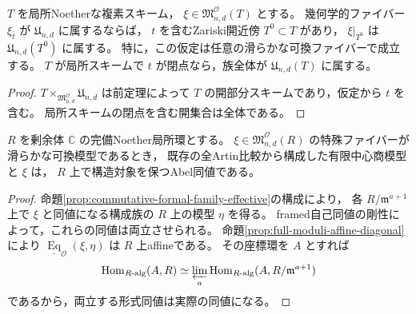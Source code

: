 \begin{corollary}[任意の族における構成近傍の開性]
\label{cor:familywise-classical-neighborhood}
$T$ を局所Noetherな複素スキーム，
$\xi\in\mathfrak M^{\mathcal O}_{n,d}(T)$ とする。
幾何学的ファイバー $\xi_{\bar t}$ が $\mathfrak U_{n,d}$ に属するならば，
$t$ を含むZariski開近傍 $T^0\subset T$ があり，
$\xi|_{T^0}$ は $\mathfrak U_{n,d}(T^0)$ に属する。
特に，この仮定は任意の滑らかな可換ファイバーで成立する。
$T$ が局所スキームで $t$ が閉点なら，族全体が $\mathfrak U_{n,d}(T)$ に属する。
\end{corollary}
\begin{proof}
$T\times_{\mathfrak M^{\mathcal O}_{n,d}}\mathfrak U_{n,d}$ は前定理によって
$T$ の開部分スキームであり，仮定から $t$ を含む。
局所スキームの閉点を含む開集合は全体である。
\end{proof}

\begin{corollary}[完備局所基底上の任意の族への形式比較の有効性]
\label{cor:arbitrary-classical-family-effective}
$R$ を剰余体 $\mathbb C$ の完備Noether局所環とする。
$\xi\in\mathfrak M^{\mathcal O}_{n,d}(R)$ の特殊ファイバーが滑らかな可換模型であるとき，
既存の全Artin比較から構成した有限中心商模型と $\xi$ は，
$R$ 上で構造対象を保つAbel同値である。
\end{corollary}
\begin{proof}
命題\ref{prop:commutative-formal-family-effective}の構成により，
各 $R/\mathfrak m^{a+1}$ 上で $\xi$ と同値になる構成族の $R$ 上の模型 $\eta$ を得る。
framed自己同値の剛性によって，これらの同値は両立させられる。
命題\ref{prop:full-moduli-affine-diagonal}により
$\underline{\operatorname{Eq}}_{\mathcal O}(\xi,\eta)$ は $R$ 上affineである。
その座標環を $A$ とすれば
\[
 \operatorname{Hom}_{R\text{-alg}}(A,R)
 \simeq\varprojlim_a
 \operatorname{Hom}_{R\text{-alg}}(A,R/\mathfrak m^{a+1})
\]
であるから，両立する形式同値は実際の同値になる。
\end{proof}
